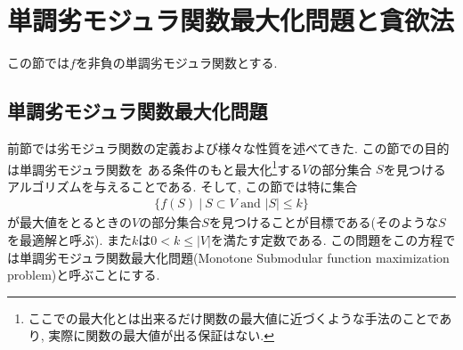 \documentclass[11pt, a4paper, dvipdfmx]{jsarticle}
\theoremstyle{definition}
\begin{document}
\section{単調劣モジュラ関数最大化問題と貪欲法}
この節では$f$を非負の単調劣モジュラ関数とする.
\subsection{単調劣モジュラ関数最大化問題}
 前節では劣モジュラ関数の定義および様々な性質を述べてきた. この節での目的は単調劣モジュラ関数を
 ある条件のもと最大化\footnote{ここでの最大化とは出来るだけ関数の最大値に近づくような手法のことであり, 実際に関数の最大値が出る保証はない.}する$V$の部分集合
 $S$を見つけるアルゴリズムを与えることである.
 そして, この節では特に集合
 \begin{align*}
    \{ f(S)~|~S\subset V\text{ and }|S| \leq k\}
 \end{align*} 
 が最大値をとるときの$V$の部分集合$S$を見つけることが目標である(そのような$S$を最適解と呼ぶ). また$k$は$0<k\leq |V|$を満たす定数である. 
 この問題をこの方程では単調劣モジュラ関数最大化問題(Monotone Submodular function maximization problem)と呼ぶことにする. 
\end{document}
